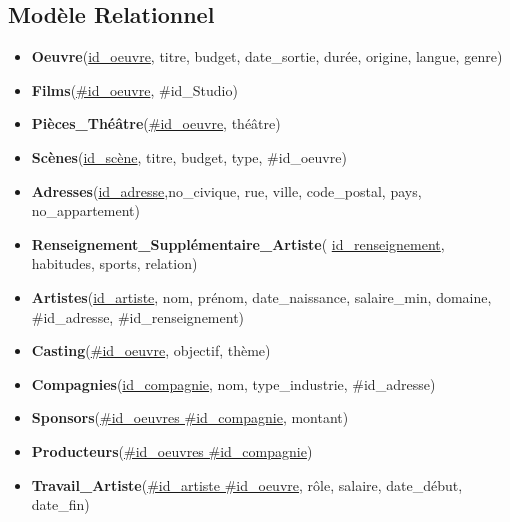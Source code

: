 \documentclass{article}
\begin{document}
\subsection{Modèle Relationnel}
\begin{itemize}
\item \textbf{Oeuvre}(\underline{id\_oeuvre}, titre, budget,
  date\_sortie, durée, origine, langue, genre)
\item \textbf{Films}(\underline{\#id\_oeuvre}, \#id\_Studio)
\item \textbf{Pièces\_Théâtre}(\underline{\#id\_oeuvre}, théâtre)
\item \textbf{Scènes}(\underline{id\_scène}, titre, budget, type,
  \#id\_oeuvre)
\item \textbf{Adresses}(\underline{id\_adresse},no\_civique, rue,
  ville, code\_postal, pays, no\_appartement)
\item \textbf{Renseignement\_Supplémentaire\_Artiste}(
  \underline{id\_renseignement}, habitudes, sports, relation)
\item \textbf{Artistes}(\underline{id\_artiste}, nom, prénom,
  date\_naissance, salaire\_min, domaine, \#id\_adresse,
  \#id\_renseignement)
\item \textbf{Casting}(\underline{\#id\_oeuvre}, objectif, thème)
\item \textbf{Compagnies}(\underline{id\_compagnie}, nom,
  type\_industrie, \#id\_adresse)
\item \textbf{Sponsors}(\underline{\#id\_oeuvres \#id\_compagnie},
  montant)
\item \textbf{Producteurs}(\underline{\#id\_oeuvres
    \#id\_compagnie})
\item \textbf{Travail\_Artiste}(\underline{\#id\_artiste
    \#id\_oeuvre}, rôle, salaire, date\_début, date\_fin)
\end{itemize}
\end{document}
